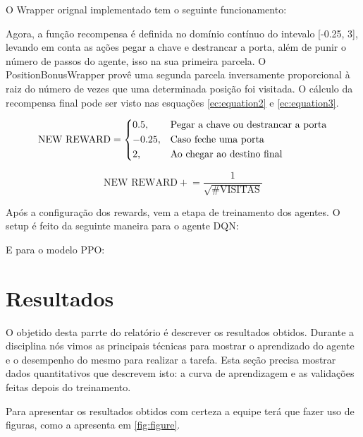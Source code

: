 \documentclass[9pt,a4paper,twoside]{tau}
\begin{document}
O Wrapper orignal implementado tem o seguinte funcionamento:


Agora, a função recompensa é definida no domínio contínuo do intevalo [-0.25, 3], levando em conta as ações pegar a chave e destrancar a porta, além de punir o número de passos do agente, isso na sua primeira parcela. O PositionBonusWrapper provê uma segunda parcela inversamente proporcional à raiz do número de vezes que uma determinada posição foi visitada. O cálculo da recompensa final pode ser visto nas esquações \ref{ec:equation2} e \ref{ec:equation3}.

\begin{equation}
    \label{ec:equation2}
    \text{NEW REWARD} =
    \begin{dcases}
        0.5,                        & \text{Pegar a chave ou destrancar a porta}     \\
        -0.25,                      & \text{Caso feche uma porta}                       \\
        2,                          & \text{Ao chegar ao destino final}
    \end{dcases}
\end{equation}

\begin{equation}
    \label{ec:equation3}
   \text{NEW REWARD} +\!= \frac{1}{\sqrt{\text{\#VISITAS}}}
\end{equation}

Após a configuração dos rewards, vem a etapa de treinamento dos agentes. O setup é feito da seguinte maneira para o agente DQN:

E para o modelo PPO:


\section{Resultados}

O objetido desta parrte do relatório é descrever os resultados obtidos. Durante a disciplina nós vimos as principais técnicas para mostrar o aprendizado do agente e o desempenho do mesmo para realizar a tarefa. Esta seção precisa mostrar dados quantitativos que descrevem isto: a curva de aprendizagem e as validações feitas depois do treinamento.

Para apresentar os resultados obtidos com certeza a equipe terá que fazer uso de figuras, como a apresenta em \ref{fig:figure}.
\end{document}
